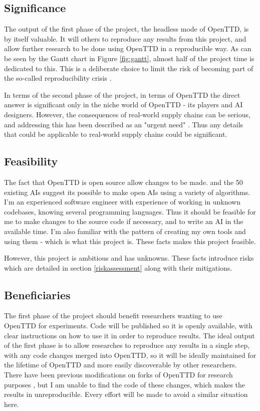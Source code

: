 \documentclass[a4paper,11pt]{article}
\begin{document}
\subsection{Significance}

The output of the first phase of the project, the headless mode of OpenTTD, is by itself valuable. It will others to reproduce any results from this project, and allow further research to be done using OpenTTD in a reproducible way. As can be seen by the Gantt chart in Figure \ref{fig:gantt}, almost half of the project time is dedicated to this. This is a deliberate choice to limit the risk of becoming part of the so-called reproducibility crisis \cite{baker_1500_2016}.

In terms of the second phase of the project, in terms of OpenTTD the direct answer is significant only in the  niche world of OpenTTD - its players and AI designers. However, the consequences of real-world supply chains can be serious, and addressing this has been described as an "urgent need" \cite{moosavi_supply_2022}. Thus any details that could be applicable to real-world supply chains could be significant.

\subsection{Feasibility}

The fact that OpenTTD is open source allow changes to be made. and the 50 existing AIs suggest its possible to make open AIs using a variety of algorithms. I'm an experienced software engineer with experience of working in unknown codebases, knowing several programming languages. Thus it should be feasible for me to make changes to the source code if necessary, and to write an AI in the available time. I'm also familiar with the pattern of creating my own tools and using them - which is what this project is. These facts makes this project feasible.

However, this project is ambitious and has unknowns. These facts introduce risks which are detailed in section \ref{riskassessment} along with their mitigations.

\subsection{Beneficiaries}

The first phase of the project should benefit researchers wanting to use OpenTTD for experiments. Code will be published so it is openly available, with clear instructions on how to use it in order to reproduce results. The ideal output of the first phase is to allow researches to reproduce any results in a single step, with any code changes merged into OpenTTD, so it will be ideally maintained for the lifetime of OpenTTD and more easily discoverable by other researchers. There have been previous modifications on forks of OpenTTD for research purposes \cite{shen_rtsenv_2011}, but I am unable to find the code of these changes, which makes the results in \cite{shen_rtsenv_2011} unreproducible. Every effort will be made to avoid a similar situation here.
\end{document}
